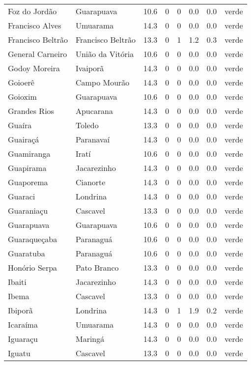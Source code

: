 \begin{longtable}{l|lllllll}
  Foz do Jordão & Guarapuava & 10.6 & 0 & 0 & 0.0 & 0.0 & verde \\ 
  Francisco Alves & Umuarama & 14.3 & 0 & 0 & 0.0 & 0.0 & verde \\ 
  Francisco Beltrão & Francisco Beltrão & 13.3 & 0 & 1 & 1.2 & 0.3 & verde \\ 
  General Carneiro & União da Vitória & 10.6 & 0 & 0 & 0.0 & 0.0 & verde \\ 
  Godoy Moreira & Ivaiporã & 14.3 & 0 & 0 & 0.0 & 0.0 & verde \\ 
  Goioerê & Campo Mourão & 14.3 & 0 & 0 & 0.0 & 0.0 & verde \\ 
  Goioxim & Guarapuava & 10.6 & 0 & 0 & 0.0 & 0.0 & verde \\ 
  Grandes Rios & Apucarana & 14.3 & 0 & 0 & 0.0 & 0.0 & verde \\ 
  Guaíra & Toledo & 13.3 & 0 & 0 & 0.0 & 0.0 & verde \\ 
  Guairaçá & Paranavaí & 14.3 & 0 & 0 & 0.0 & 0.0 & verde \\ 
  Guamiranga & Iratí & 10.6 & 0 & 0 & 0.0 & 0.0 & verde \\ 
  Guapirama & Jacarezinho & 14.3 & 0 & 0 & 0.0 & 0.0 & verde \\ 
  Guaporema & Cianorte & 14.3 & 0 & 0 & 0.0 & 0.0 & verde \\ 
  Guaraci & Londrina & 14.3 & 0 & 0 & 0.0 & 0.0 & verde \\ 
  Guaraniaçu & Cascavel & 13.3 & 0 & 0 & 0.0 & 0.0 & verde \\ 
  Guarapuava & Guarapuava & 10.6 & 0 & 0 & 0.0 & 0.0 & verde \\ 
  Guaraqueçaba & Paranaguá & 10.6 & 0 & 0 & 0.0 & 0.0 & verde \\ 
  Guaratuba & Paranaguá & 10.6 & 0 & 0 & 0.0 & 0.0 & verde \\ 
  Honório Serpa & Pato Branco & 13.3 & 0 & 0 & 0.0 & 0.0 & verde \\ 
  Ibaiti & Jacarezinho & 14.3 & 0 & 0 & 0.0 & 0.0 & verde \\ 
  Ibema & Cascavel & 13.3 & 0 & 0 & 0.0 & 0.0 & verde \\ 
  Ibiporã & Londrina & 14.3 & 0 & 1 & 1.9 & 0.2 & verde \\ 
  Icaraíma & Umuarama & 14.3 & 0 & 0 & 0.0 & 0.0 & verde \\ 
  Iguaraçu & Maringá & 14.3 & 0 & 0 & 0.0 & 0.0 & verde \\ 
  Iguatu & Cascavel & 13.3 & 0 & 0 & 0.0 & 0.0 & verde \\ 

\end{longtable}
